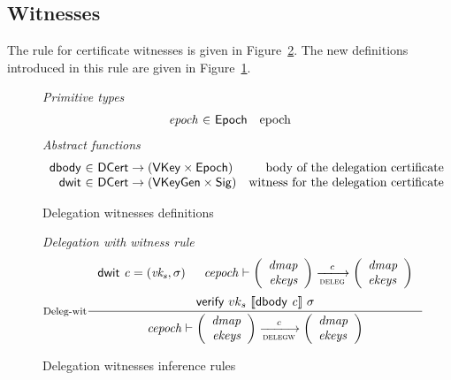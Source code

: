 \subsection{Witnesses}
\label{sec:delegation-witnesses}

The rule for certificate witnesses is given in
Figure~\ref{fig:rules:delegationw}. The new definitions introduced in this rule
are given in Figure~\ref{fig:defs:delegationw}.

\begin{figure}
  \emph{Primitive types}
  \begin{equation*}
    \begin{array}{r@{~\in~}lr}
      \var{epoch} & \Epoch & \text{epoch}
    \end{array}
  \end{equation*}
  \emph{Abstract functions}
  \begin{equation*}
    \begin{array}{r@{~\in~}lr}
      \fun{dbody} & \DCert \to (\VKey \times \Epoch)
      & \text{body of the delegation certificate}\\
      \fun{dwit} & \DCert \to (\VKeyGen \times \Sig)
      & \text{witness for the delegation certificate}
    \end{array}
  \end{equation*}
  \caption{Delegation witnesses definitions}
  \label{fig:defs:delegationw}
\end{figure}

\begin{figure}
  \emph{Delegation with witness rule}
  \begin{equation}
    \label{eq:deleg-witnesses}
    \inference[Deleg-wit]
    { \dwit{c} = (\var{vk_s}, \sigma)
      & \var{cepoch} \vdash
      {\left(
        \begin{array}{r}
          \var{dmap}\\
          \var{ekeys}
        \end{array}
      \right)}
      \trans{deleg}{c}
      {\left(
      \begin{array}{l}
          \var{dmap}\\
          \var{ekeys}
      \end{array}
      \right)}
      \\ ~ \\
      \verify{vk_s}{\serialised{\dbody{c}}}{\sigma}
    }
    {\var{cepoch} \vdash
      {\left(
        \begin{array}{r}
          \var{dmap}\\
          \var{ekeys}
        \end{array}
      \right)}
      \trans{delegw}{c}
      {\left(
      \begin{array}{l}
          \var{dmap}\\
          \var{ekeys}
      \end{array}
      \right)}}
  \end{equation}
  \caption{Delegation witnesses inference rules}
  \label{fig:rules:delegationw}
\end{figure}
